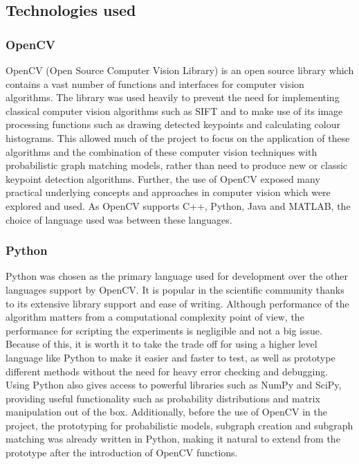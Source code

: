 \subsection{Technologies used}

\subsubsection{OpenCV}
OpenCV (Open Source Computer Vision Library) \cite{opencv} is an open source library which contains a vast number of functions and interfaces for computer vision algorithms. The library was used heavily to prevent the need for implementing classical computer vision algorithms such as SIFT \cite{sift} and to make use of its image processing functions such as drawing detected keypoints and calculating colour histograms. This allowed much of the project to focus on the application of these algorithms and the combination of these computer vision techniques with probabilistic graph matching models, rather than need to produce new or classic keypoint detection algorithms. Further, the use of OpenCV exposed many practical underlying concepts and approaches in computer vision which were explored and used.
\n
As OpenCV supports C++, Python, Java and MATLAB, the choice of language used was between these languages. 

\subsubsection{Python}
Python was chosen as the primary language used for development over the other languages support by OpenCV. It is popular in the scientific community thanks to its extensive library support and ease of writing. Although performance of the algorithm matters from a computational complexity point of view, the performance for scripting the experiments is negligible and not a big issue. Because of this, it is worth it to take the trade off for using a higher level language like Python to make it easier and faster to test, as well as prototype different methods without the need for heavy error checking and debugging. Using Python also gives access to powerful libraries such as NumPy and SciPy, providing useful functionality such as probability distributions and matrix manipulation out of the box. Additionally, before the use of OpenCV in the project, the prototyping for probabilistic models, subgraph creation and subgraph matching was already written in Python, making it natural to extend from the prototype after the introduction of OpenCV functions. 

